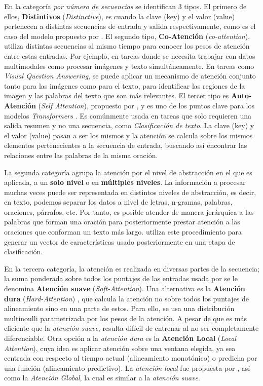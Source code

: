En la categoría \textit{por número de secuencias} se identifican 3 tipos. El primero de ellos,
\textbf{Distintivos} (\textit{Distinctive}), es cuando la clave (key) y el valor (value) pertenecen a
distintas secuencias de entrada y salida respectivamente, como es el caso del modelo propuesto por
\citeauthor{bahdanau2016neural}. El segundo tipo, \textbf{Co-Atención} (\textit{co-attention}), utiliza
distintas secuencias al mismo tiempo para conocer los pesos de atención entre estas entradas. Por ejemplo,
en tareas donde se necesita trabajar con datos multimodales como procesar imágenes y texto
simultáneamente. En tareas como \textit{Visual Question Answering}, se puede aplicar un mecanismo de
atención conjunto tanto para las imágenes como para el texto, para identificar las regiones de la imagen
y las palabras del texto que son más relevantes. El tercer tipo es \textbf{Auto-Atención} (\textit{Self
Attention}), propuesto por \citeauthor{yang2016hierarchical}, y es uno de los puntos clave para los
modelos \textit{Transformers} \cite{DBLP:journals/corr/VaswaniSPUJGKP17}. Es comúnmente usada en tareas
que solo requieren una salida resumen y no una secuencia, como \textit{Clasificación de texto}. La clave
(key) y el valor (value) pasan a ser los mismos y la atención se calcula sobre los mismos elementos
pertenecientes a la secuencia de entrada, buscando así encontrar las relaciones entre las palabras de la
misma oración.

La segunda categoría agrupa la atención por el nivel de abstracción en el que es aplicada, a un
\textbf{solo nivel} o en \textbf{múltiples niveles}. La información a procesar muchas veces puede ser
representada en distintos niveles de abstracción, es decir, en texto, podemos separar los datos a
nivel de letras, n-gramas, palabras, oraciones, párrafos, etc. Por tanto, es posible atender de manera
jerárquica a las palabras que forman una oración para posteriormente prestar atención a las oraciones
que conforman un texto más largo. \citeauthor{yang2016hierarchical} utiliza este procedimiento para
generar un vector de características usado posteriormente en una etapa de clasificación.

En la tercera categoría, la atención es realizada en diversas partes de la secuencia; la suma ponderada
sobre todos los puntajes de las entradas usada por \citeauthor{bahdanau2016neural} se le denomina
\textbf{Atención suave} (\textit{Soft-Attention}). Una alternativa es la \textbf{Atención dura}
(\textit{Hard-Attention}) \cite{DBLP:journals/corr/XuBKCCSZB15}, que calcula la atención no sobre todos
los puntajes de alineamiento sino en una parte de estos. Para ello, se usa una distribución multinoulli
parametrizada por los pesos de la atención. A pesar de que es más eficiente que la \textit{atención
suave}, resulta difícil de entrenar al no ser completamente diferenciable. Otra opción a la
\textit{atención dura} es la \textbf{Atención Local} (\textit{Local Attention}), cuya idea es aplicar
atención sobre una ventana elegida, ya sea centrada con respecto al tiempo actual (alineamiento
monotónico) o predicha por una función (alineamiento predictivo). La \textit{atención local} fue
propuesta por \citeauthor{DBLP:journals/corr/LuongPM15}, así como la \textit{Atención Global}, la cual
es similar a la \textit{atención suave}.

